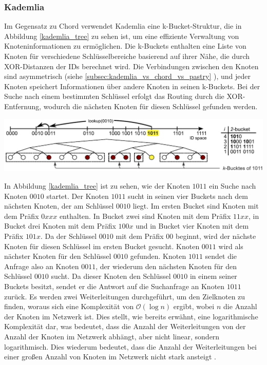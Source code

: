 \subsubsection{Kademlia}
Im Gegensatz zu Chord verwendet Kademlia eine k-Bucket-Struktur, die in Abbildung \ref{kademlia_tree} zu sehen ist, um eine effiziente Verwaltung von Knoteninformationen zu ermöglichen. Die k-Buckets enthalten eine Liste von Knoten für verschiedene Schlüsselbereiche basierend auf ihrer Nähe, die durch XOR-Distanzen der IDs berechnet wird. Die Verbindungen zwischen den Knoten sind asymmetrisch (siehe \ref{subsec:kademlia_vs_chord_vs_pastry} \textit{}), und jeder Knoten speichert Informationen über andere Knoten in seinen k-Buckets. Bei der Suche nach einem bestimmten Schlüssel erfolgt das Routing durch die XOR-Entfernung, wodurch die nächsten Knoten für diesen Schlüssel gefunden werden.

\begin{center}
    \captionsetup{type=figure}
    \includegraphics[width=1\linewidth]{images/kademlia_tree_altered.png}
    \label{kademlia_tree}
\end{center}

\noindent In Abbildung \ref{kademlia_tree} ist zu sehen, wie der Knoten $1011$ ein Suche nach Knoten $0010$ startet. Der Knoten $1011$ sucht in seinen vier Buckets nach dem nächsten Knoten, der am Schlüssel $0010$ liegt. Im ersten Bucket sind Knoten mit dem Präfix $0xxx$ enthalten. In Bucket zwei sind Knoten mit dem Präfix $11xx$, in Bucket drei Knoten mit dem Präfix $100x$ und in Bucket vier Knoten mit dem Präfix $101x$. Da der Schlüssel $0010$ mit dem Präfix $00$ beginnt, wird der nächste Knoten für diesen Schlüssel im ersten Bucket gesucht. Knoten $0011$ wird als nächster Knoten für den Schlüssel $0010$ gefunden. Knoten $1011$ sendet die Anfrage also an Knoten $0011$, der wiederum den nächsten Knoten für den Schlüssel $0010$ sucht. Da dieser Knoten den Schlüssel $0010$ in einem seiner Buckets besitzt, sendet er die Antwort auf die Suchanfrage an Knoten $1011$ zurück. Es werden zwei Weiterleitungen durchgeführt, um den Zielknoten zu finden, woraus sich eine Komplexität von $\mathcal{O}(\log n)$ ergibt, wobei $n$ die Anzahl der Knoten im Netzwerk ist. Dies stellt, wie bereits erwähnt, eine logarithmische Komplexität dar, was bedeutet, dass die Anzahl der Weiterleitungen von der Anzahl der Knoten im Netzwerk abhängt, aber nicht linear, sondern logarithmisch. Dies wiederum bedeutet, dass die Anzahl der Weiterleitungen bei einer großen Anzahl von Knoten im Netzwerk nicht stark ansteigt \Parencite[S. 812]{MedranoChavez_ChordKademliaHighChurnScenarios}.


